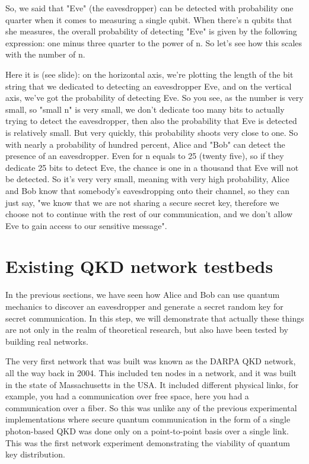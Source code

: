 So, we said that "Eve" (the eavesdropper) can be detected with probability one quarter when it comes to measuring a single qubit. When there's n qubits that she measures, the overall probability of detecting "Eve" is given by the following expression: one minus three quarter to the power of n. So let's see how this scales with the number of n.

Here it is (see slide): on the horizontal axis, we're plotting the length of the bit string that we dedicated to detecting an eavesdropper Eve, and on the vertical axis, we've got the probability of detecting Eve. So you see, as the number is very small, so "small n" is very small, we don't dedicate too many bits to actually trying to detect the eavesdropper, then also the probability that Eve is detected is relatively small. But very quickly, this probability shoots very close to one. So with nearly a probability of hundred percent, Alice and "Bob" can detect the presence of an eavesdropper. Even for n equals to 25 (twenty five), so if they dedicate 25 bits to detect Eve, the chance is one in a thousand that Eve will not be detected. So it's very very small, meaning with very high probability, Alice and Bob know that somebody's eavesdropping onto their channel, so they can just say, "we know that we are not sharing a secure secret key, therefore we choose not to continue with the rest of our communication, and we don't allow Eve to gain access to our sensitive message".

\section{Existing QKD network testbeds}

In the previous sections, we have seen how Alice and Bob can use quantum mechanics to discover an eavesdropper and generate a secret random key for secret communication. In this step, we will demonstrate that actually these things are not only in the realm of theoretical research, but also have been tested by building real networks.

The very first network that was built was known as the DARPA QKD network, all the way back in 2004. This included ten nodes in a network, and it was built in the state of Massachusetts in the USA. It included different physical links, for example, you had a communication over free space, here you had a communication over a fiber. So this was unlike any of the previous experimental implementations where secure quantum communication in the form of a single photon-based QKD was done only on a point-to-point basis over a single link. This was the first network experiment demonstrating the viability of quantum key distribution.

